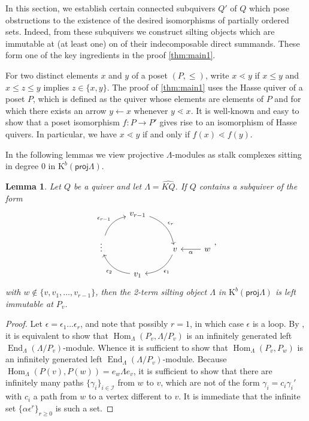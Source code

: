 \documentclass[11pt]{amsart}
\newcommand{\proj}{\mathsf{proj}}
\DeclareMathOperator{\Hom}{\mathrm{Hom}}
\DeclareMathOperator{\End}{\mathrm{End}}
\newtheorem{lemma}[theorem]{Lemma}
\theoremstyle{definition}
\begin{document}
In this section, we establish certain connected subquivers $Q'$ of $Q$ which pose obstructions to the existence of the desired isomorphisms of partially ordered sets. Indeed, from these subquivers we construct silting objects which are immutable at (at least one) on of their indecomposable direct summands. These form one of the key ingredients in the proof \cref{thm:main1}. 

For two distinct elements $x$ and $y$ of a poset $(P,\leq)$, write $x \lessdot y$ if $x \leq y$ and $x \leq z \leq y$ implies $z \in \{x,y\}$. The proof of \cref{thm:main1} uses the Hasse quiver of a poset $P$, which is defined as the quiver whose elements are elements of $P$ and for which there exists an arrow $y \leftarrow x$ whenever $y \lessdot x$. It is well-known and easy to show that a poset isomorphism $f: P \to P'$ gives rise to an isomorphism of Hasse quivers. In particular, we have $x \lessdot y$ if and only if $f(x) \lessdot f(y)$. 

In the following lemmas we view projective $\Lambda$-modules as stalk complexes sitting in degree 0 in $\mathrm{K}^b(\proj \Lambda)$.


\begin{lemma}\label{lem:mutprobcyclein}
	Let $Q$ be a quiver and let $\Lambda = \widehat{KQ}$. If $Q$ contains a subquiver of the form 
	\[ \begin{tikzcd} 
	& v_{r-1} \arrow[rd, bend left, "\epsilon_r"] \\
	\vdots \arrow[ru, bend left, "\epsilon_{r-1}"] &&v \arrow[ld, bend left, "\epsilon_1"] & w \arrow[l, "\alpha"] \\
	&v_1 \arrow[lu, bend left, "\epsilon_2"]
	 \end{tikzcd}, \]
	with $w \not \in \{v, v_1, \dots, v_{r-1}\}$, then the 2-term silting object $\Lambda$ in $\mathrm{K}^b(\proj \Lambda)$ is left immutable at $P_v$. 
\end{lemma}
\begin{proof}
	Let $\epsilon = \epsilon_1 \dots \epsilon_r$, and note that possibly $r=1$, in which case $\epsilon$ is a loop. By \cite[Lem. 2.2]{Kimura2024}, it is equivalent to show that $\Hom_{\Lambda}(P_v, \Lambda/P_v)$ is an infinitely generated left $\End_{\Lambda}(\Lambda/P_v)$-module. Whence it is sufficient to show that $\Hom_{\Lambda}(P_v, P_w)$ is an infinitely generated left $\End_{\Lambda}(\Lambda/P_v)$-module. Because $\Hom_{\Lambda}(P(v), P(w)) = e_w \Lambda e_v$, it is sufficient to show that there are infinitely many paths $\{\gamma_i\}_{i \in \mathcal{I}}$ from $w$ to $v$, which are not of the form $\gamma_i = c_i \gamma_i'$ with $c_i$ a path from $w$ to a vertex different to $v$. It is immediate that the infinite set $\{\alpha \epsilon^r\}_{r\geq0}$ is such a set.
\end{proof}
\end{document}

